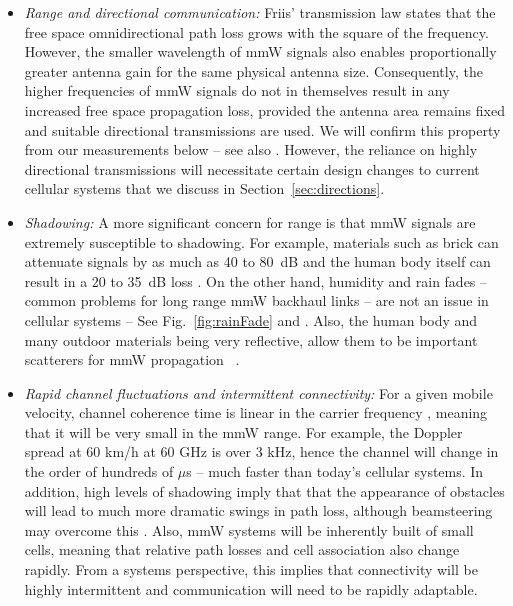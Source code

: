 \documentclass[journal]{IEEEtran}
\begin{document}
\begin{itemize}
\item \emph{Range and directional communication:}
Friis' transmission law \cite{Rappaport:02} states that the free space
omnidirectional path loss grows with the square of the frequency.
However, the smaller wavelength of mmW signals also enables proportionally greater
antenna gain for the same physical antenna size.  Consequently,
the higher frequencies of mmW signals do not in themselves result in any
increased free space propagation loss, provided
the antenna area remains fixed
and suitable directional transmissions are used.  We will confirm this property
from our measurements below -- see also \cite{Sun-Beam:13}.
However, the reliance on highly directional transmissions will necessitate
certain design changes to current cellular systems
that we discuss in Section~\ref{sec:directions}.

\item \emph{Shadowing:}
A more significant concern for range is that
mmW signals are extremely susceptible to shadowing.  For example,
materials such as brick can attenuate signals by as much as 40 to
80~dB\cite{Allen:94,Anderson04,Alejos:08,KhanPi:11-CommMag,Rappaport:28NYCPenetrationLoss}
and the human body itself can result in a 20 to 35~dB loss \cite{LuSCP:12}.
On the other hand, humidity and rain fades -- common problems for long range
mmW backhaul links -- are not an issue in cellular systems
-- See Fig.~\ref{fig:rainFade} and \cite{Ted:60Gstate11,rappaportmillimeter}.
Also, the human body and many outdoor materials
being very reflective, allow
them to be important scatterers for mmW propagation~
\cite{ben2011millimeter,Rappaport:28NYCPenetrationLoss}.

\item \emph{Rapid channel fluctuations and intermittent connectivity:}
For a given mobile velocity, channel  coherence time is
linear in the carrier frequency \cite{Rappaport:02}, meaning that it will be very small
in the mmW range.  For example, the Doppler spread at
60 km/h at 60 GHz is over 3 kHz, hence the channel will change in the order of hundreds of $\mu$s
-- much faster than today's cellular systems.  In addition, high levels of shadowing imply
that that the appearance of obstacles will lead to much more dramatic swings in path loss,
although beamsteering may overcome this \cite{rappaportmillimeter}.
Also, mmW systems will be inherently built of small cells,
 meaning that relative path losses
and cell association also change rapidly.
From a systems perspective, this implies that connectivity will be highly intermittent
and communication will need to be rapidly adaptable.


\end{itemize}
\end{document}

